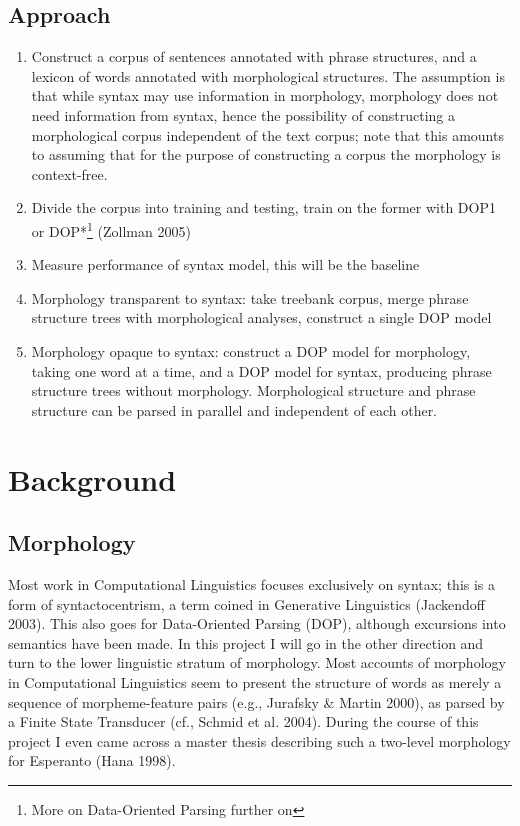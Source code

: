 \documentclass[10pt,a4paper]{article}
\begin{document}
\subsection{Approach}

\begin{enumerate}
\item Construct a corpus of sentences annotated with phrase structures, and a 
lexicon of words annotated with morphological structures. The assumption is
that while syntax may use information in morphology, morphology does not need
information from syntax, hence the possibility of constructing a morphological
corpus independent of the text corpus; note that this amounts to assuming that
for the purpose of constructing a corpus the morphology is context-free.
\item Divide the corpus into training and testing, train on the former with DOP1 or 
DOP*\footnote{More on Data-Oriented Parsing further on} (Zollman 2005)
\item Measure performance of syntax model, this will be the baseline
\item Morphology transparent to syntax: take treebank corpus, merge phrase 
structure trees with morphological analyses, construct a single DOP model
\item Morphology opaque to syntax: construct a DOP model for morphology, taking
one word at a time, and a DOP model for syntax, producing phrase structure
trees without morphology. Morphological structure and phrase structure can be
parsed in parallel and independent of each other.
\end{enumerate}

\section{Background}
\subsection{Morphology}

Most work in Computational Linguistics focuses exclusively on syntax; this is
a form of syntactocentrism, a term coined in Generative Linguistics 
(Jackendoff 2003). This also goes for Data-Oriented Parsing (DOP), although
excursions into semantics have been made. In this project I will go in the
other direction and turn to the lower linguistic stratum of morphology. Most
accounts of morphology in Computational Linguistics seem to present the
structure of words as merely a sequence of morpheme-feature pairs (e.g.,
Jurafsky \& Martin 2000), as parsed by a Finite State Transducer (cf., Schmid
et al.  2004). During the course of this project I even came across a master
thesis describing such a two-level morphology for Esperanto (Hana 1998).
\end{document}
